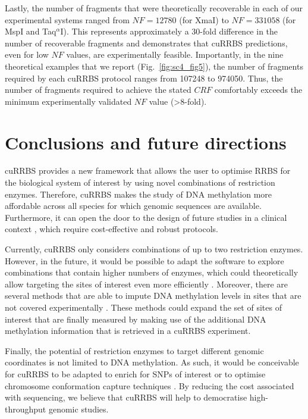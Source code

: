 \bigskip

Lastly, the number of fragments that were theoretically recoverable in each of our experimental systems ranged from $NF = 12780$ (for XmaI) to $NF = 331058$ (for MspI and Taq$^\alpha$I). This represents approximately a 30-fold difference in the number of recoverable fragments and demonstrates that cuRRBS predictions, even for low $NF$ values, are experimentally feasible. Importantly, in the nine theoretical examples that we report (Fig.~\ref{fig:sc4_fig5}), the number of fragments required by each cuRRBS protocol ranges from 107248 to 974050. Thus, the number of fragments required to achieve the stated $CRF$ comfortably exceeds the minimum experimentally validated $NF$ value (>8-fold). 

\smallskip

\section{Conclusions and future directions}

\smallskip

cuRRBS provides a new framework that allows the user to optimise RRBS for the biological system of interest by using novel combinations of restriction enzymes. Therefore, cuRRBS makes the study of DNA methylation more affordable across all species for which genomic sequences are available. Furthermore, it can open the door to the design of future studies in a clinical context \citep{Lee2014}, which require cost-effective and robust protocols.

\bigskip

Currently, cuRRBS only considers combinations of up to two restriction enzymes. However, in the future, it would be possible to adapt the software to explore combinations that contain higher numbers of enzymes, which could theoretically allow targeting the sites of interest even more efficiently \citep{Bystrykh2013}. Moreover, there are several methods that are able to impute DNA methylation levels in sites that are not covered experimentally \citep{Zhang2015,Angermueller2017}. These methods could expand the set of sites of interest that are finally measured by making use of the additional DNA methylation information that is retrieved in a cuRRBS experiment. 

\bigskip

Finally, the potential of restriction enzymes to target different genomic coordinates is not limited to DNA methylation. As such, it would be conceivable for cuRRBS to be adapted to enrich for SNPs of interest \citep{Davey2011,Davey2011a} or to optimise chromosome conformation capture techniques \citep{Naumova2012,Dekker2013}. By reducing the cost associated with sequencing, we believe that cuRRBS will help to democratise high-throughput genomic studies. 

